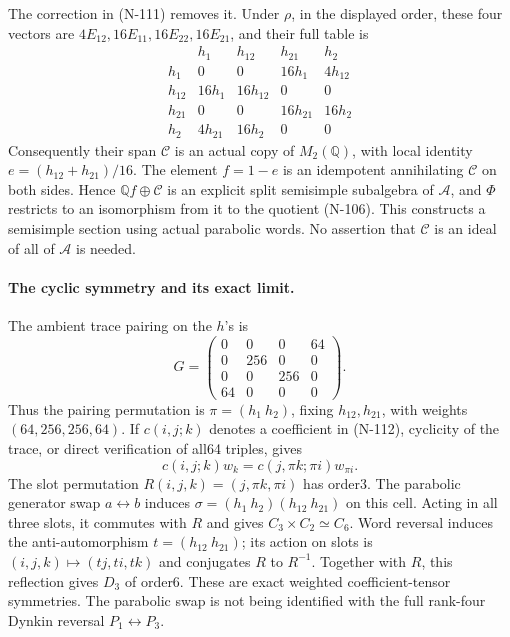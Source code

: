 The correction in (N-111) removes it.  Under $\rho$, in the
displayed order, these four vectors are
$4E_{12},16E_{11},16E_{22},16E_{21}$, and their full table is
\[
\begin{array}{c|rrrr}
 &h_1&h_{12}&h_{21}&h_2\\\hline
 h_1&0&0&16h_1&4h_{12}\\
 h_{12}&16h_1&16h_{12}&0&0\\
 h_{21}&0&0&16h_{21}&16h_2\\
 h_2&4h_{21}&16h_2&0&0
\end{array}
\tag{N-112}
\]
Consequently their span $\mathcal C$ is an actual copy of
$M_2(\mathbb Q)$, with local identity
$e=(h_{12}+h_{21})/16$.  The element $f=1-e$ is an idempotent
annihilating $\mathcal C$ on both sides.  Hence
$\mathbb Qf\oplus\mathcal C$ is an explicit split semisimple
subalgebra of $\mathcal A$, and $\Phi$ restricts to an
isomorphism from it to the quotient (N-106).
This constructs a semisimple section using actual parabolic
words.  No assertion that $\mathcal C$ is an ideal of all of
$\mathcal A$ is needed.

\paragraph{The cyclic symmetry and its exact limit.}
The ambient trace pairing on the $h$'s is
\[
 G=\begin{pmatrix}
 0&0&0&64\\0&256&0&0\\0&0&256&0\\64&0&0&0
 \end{pmatrix}.
 \tag{N-113}
\]
Thus the pairing permutation is
$\pi=(h_1\ h_2)$, fixing $h_{12},h_{21}$, with weights
$(64,256,256,64)$.  If $c(i,j;k)$ denotes a coefficient in
(N-112), cyclicity of the trace, or direct verification of
all64 triples, gives
\[
 c(i,j;k)w_k=c(j,\pi k;\pi i)w_{\pi i}.
 \tag{N-114}
\]
The slot permutation $R(i,j,k)=(j,\pi k,\pi i)$ has order3.
The parabolic generator swap $a\leftrightarrow b$ induces
$\sigma=(h_1\ h_2)(h_{12}\ h_{21})$ on this cell.
Acting in all three slots, it commutes with $R$ and gives
$C_3\times C_2\simeq C_6$.  Word reversal induces the
anti-automorphism $t=(h_{12}\ h_{21})$; its action on slots
is $(i,j,k)\mapsto(tj,ti,tk)$ and conjugates $R$ to $R^{-1}$.
Together with $R$, this reflection gives $D_3$ of order6.
These are exact weighted coefficient-tensor symmetries.
The parabolic swap is not being identified with the full
rank-four Dynkin reversal $P_1\leftrightarrow P_3$.

